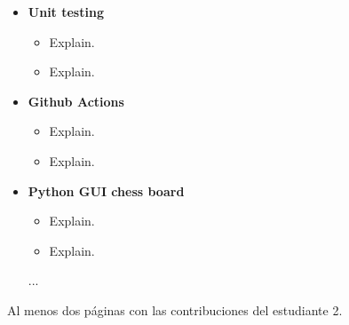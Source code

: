 \begin{itemize}
    \item \textbf{Unit testing}
    \begin{itemize}
        \item Explain.
        \item Explain.
    \end{itemize}
    
    \item \textbf{Github Actions}
    \begin{itemize}
        \item Explain.
        \item Explain.
    \end{itemize}

    \item \textbf{Python GUI chess board}
    \begin{itemize}
        \item Explain.
        \item Explain.
    \end{itemize}

    ...
\end{itemize}

Al menos dos páginas con las contribuciones del estudiante 2.
